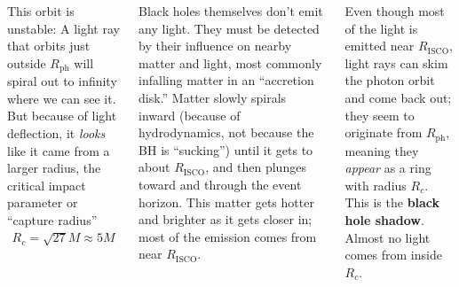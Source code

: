 \documentclass[25pt, a0paper, landscape]{tikzposter}
\begin{document}
\begin{columns}
{      This orbit is unstable: A light ray that orbits just outside
      $R_{\text{ph}}$ will spiral out to infinity where we can see it. But
      because of light deflection, it \emph{looks} like it came from a larger
      radius, the critical impact parameter or ``capture radius''
      \begin{align*}
        R_{c} =\sqrt{27}M \approx 5M
      \end{align*}

      Black holes themselves don’t emit any light. They must be
      detected by their influence on nearby matter and light, most
      commonly infalling matter in an ``accretion disk.'' Matter
      slowly spirals inward (because of hydrodynamics, not because the
      BH is ``sucking'') until it gets to about $R_{\text{ISCO}}$, and
      then plunges toward and through the event horizon. This
      matter gets hotter and brighter as it gets closer in; most of
      the emission comes from near $R_{\text{ISCO}}$.

      Even though most of the light is emitted near $R_{\text{ISCO}}$,
      light rays can skim the photon orbit and come back out; they
      seem to originate from $R_{\text{ph}}$, meaning they \emph{appear} as a
      ring with radius $R_{c}$. This is the \textbf{black hole
        shadow}. Almost no light comes from inside $R_c$.
    }

\end{columns}
\end{document}
